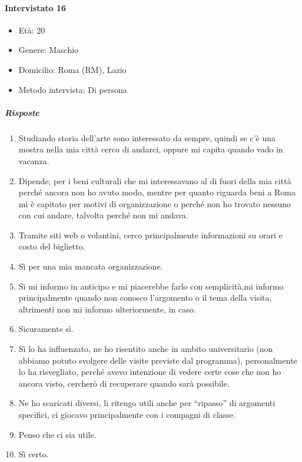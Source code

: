 \documentclass{article}
\begin{document}
\paragraph{Intervistato 16}
\begin{itemize}
\item Età: 20
\item Genere: Maschio
\item Domicilio: Roma (RM), Lazio
\item Metodo intervista: Di persona
\end{itemize}
\subparagraph{Risposte}
\begin{enumerate}
\item Studiando storia dell’arte sono interessato da sempre, quindi se c’è una mostra nella mia città cerco di andarci, oppure mi capita quando vado in vacanza.
\item Dipende, per i beni culturali che mi interessavano al di fuori della mia città perché ancora non ho avuto modo, mentre  per quanto riguarda beni a Roma mi è capitato per motivi di organizzazione o perché non ho trovato nessuno con cui andare, talvolta perché non mi andava.
\item Tramite siti web o volantini, cerco principalmente informazioni su orari e costo del biglietto.
\item Sì per una mia mancata organizzazione.
\item Sì mi informo in anticipo e mi piacerebbe farlo con semplicità,mi informo principalmente quando non conosco l’argomento o il tema  della visita, altrimenti non mi informo ulteriormente, in caso.
\item Sicuramente sì.
\item Sì lo ha influenzato, ne ho risentito anche in ambito universitario (non abbiamo potuto svolgere delle visite previste dal programma), personalmente lo ha risvegliato, perché avevo intenzione di vedere certe cose che non ho ancora visto, cercherò di recuperare quando sarà possibile.
\item Ne ho scaricati diversi, li ritengo utili anche per “ripasso” di argomenti specifici, ci giocavo principalmente con i compagni di classe.
\item Penso che ci sia utile.
\item Sì certo.
\end{enumerate}
\end{document}

